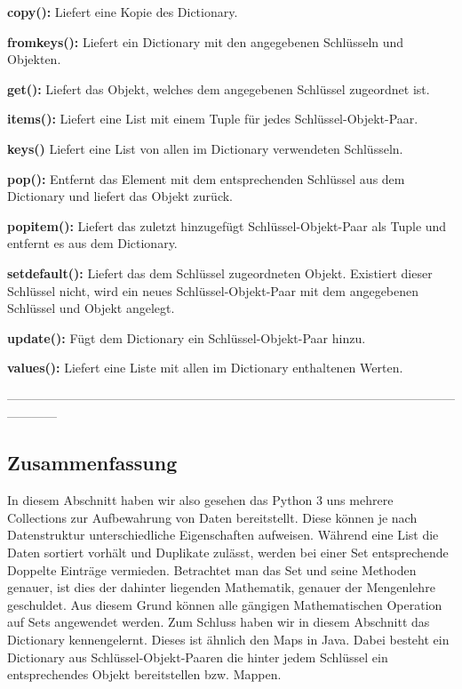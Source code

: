 \textbf{copy():}
Liefert eine Kopie des Dictionary.


\textbf{fromkeys():}
Liefert ein Dictionary mit den angegebenen Schlüsseln und Objekten.


\textbf{get():}
Liefert das Objekt, welches dem angegebenen Schlüssel zugeordnet ist.


\textbf{items():}
Liefert eine List mit einem Tuple für jedes Schlüssel-Objekt-Paar.


\textbf{keys()}
Liefert eine List von allen im Dictionary verwendeten Schlüsseln.


\textbf{pop():}
Entfernt das Element mit dem entsprechenden Schlüssel aus dem Dictionary und liefert das Objekt zurück.


\textbf{popitem():}
Liefert das zuletzt hinzugefügt Schlüssel-Objekt-Paar als Tuple und entfernt es aus dem Dictionary.


\textbf{setdefault():}
Liefert das dem Schlüssel zugeordneten Objekt. Existiert dieser Schlüssel nicht, wird ein neues Schlüssel-Objekt-Paar mit dem angegebenen Schlüssel und Objekt angelegt.


\textbf{update():}
Fügt dem Dictionary ein Schlüssel-Objekt-Paar hinzu.


\textbf{values():}
Liefert eine Liste mit allen im Dictionary enthaltenen Werten.






------------------------------------------------------------------------------------------------------------------------
\subsection{Zusammenfassung}
In diesem Abschnitt haben wir also gesehen das Python 3 uns mehrere Collections zur Aufbewahrung von Daten bereitstellt. Diese können je nach Datenstruktur unterschiedliche Eigenschaften aufweisen. Während eine List die Daten sortiert vorhält und Duplikate zulässt, werden bei einer Set entsprechende Doppelte Einträge vermieden. Betrachtet man das Set und seine Methoden genauer, ist dies der dahinter liegenden Mathematik, genauer der Mengenlehre geschuldet. Aus diesem Grund können alle gängigen Mathematischen Operation auf Sets angewendet werden. Zum Schluss haben wir in diesem Abschnitt das Dictionary kennengelernt. Dieses ist ähnlich den Maps in Java. Dabei besteht ein Dictionary aus Schlüssel-Objekt-Paaren die hinter jedem Schlüssel ein entsprechendes Objekt bereitstellen bzw. Mappen.
